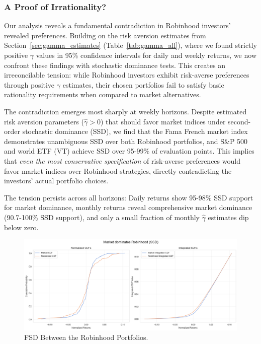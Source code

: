 \subsubsection{A Proof of Irrationality?}
Our analysis reveals a fundamental contradiction in Robinhood investors' revealed preferences. 
Building on the risk aversion estimates from Section~\ref{sec:gamma_estimates} (Table~\ref{tab:gamma_all}), where we found strictly positive \(\gamma\) values in 95\% confidence intervals for daily and weekly returns, we now confront these findings with stochastic dominance tests. 
This creates an irreconcilable tension: while Robinhood investors exhibit risk-averse preferences through positive \(\gamma\) estimates, their chosen portfolios fail to satisfy basic rationality requirements when compared to market alternatives.

The contradiction emerges most sharply at weekly horizons. 
Despite estimated risk aversion parameters (\(\hat{\gamma} > 0\)) that should favor market indices under second-order stochastic dominance (SSD), we find that the Fama French market index demonstrates unambiguous SSD over both Robinhood portfolios, 
and S\&P 500 and world ETF (VT) achieve SSD over 95-99\% of evaluation points.
This implies that \emph{even the most conservative specification} of risk-averse preferences would favor market indices over Robinhood strategies, directly contradicting the investors' actual portfolio choices.

The tension persists across all horizons: Daily returns show 95-98\% SSD support for market dominance, monthly returns reveal comprehensive market dominance (90.7-100\% SSD support), and only a small fraction of monthly \(\hat{\gamma}\) estimates dip below zero.

\begin{figure}[ht]
    \centering
    \includegraphics[width=0.8\linewidth]{../images/risk/ssd_number_5d_mkt.png}
    \caption{FSD Between the Robinhood Portfolios.}
    \label{fig:fsd_fedyk_mine}
\end{figure}    

